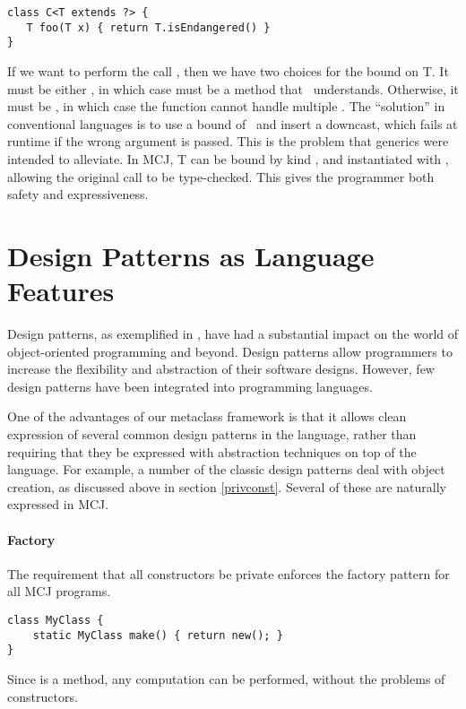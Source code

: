 \documentclass[10pt]{acm-sigplan}
\begin{document}
\begin{verbatim}
class C<T extends ?> {
   T foo(T x) { return T.isEndangered() }
}
\end{verbatim}

If we want to perform the call {}, then we have two
choices for the bound  on {\txt T}.  It must be either \Object,
in which case {} must be a method that \Object\
understands. Otherwise, it must be , in which case the
function cannot handle multiple {\txt{Species}}.  The ``solution'' in
conventional languages is to use a bound of \Object\ and insert a
downcast, which fails at runtime if the wrong argument is passed.
This is the problem that generics were intended to alleviate.  In
MCJ, {\txt T} can be bound by kind {\txt{Species}}, and instantiated
with {\txt{Eagle}}, allowing the original call to be type-checked.
This gives the programmer both safety and expressiveness.

\section{Design Patterns as Language Features}
\label{designpatterns}

Design patterns, as exemplified in \cite{GOF}, have had a substantial
impact on the world of object-oriented programming and beyond.  Design
patterns allow programmers to increase the flexibility and abstraction
of their software designs.  However, few design patterns have been
integrated into programming languages.

One of the advantages of our metaclass framework is that it allows
clean expression of several common design patterns in the language,
rather than requiring that they be expressed with abstraction
techniques on top of the language.  For example, a number of the
classic design patterns deal with object creation, as discussed above
in section \ref{privconst}.  Several of these are naturally expressed
in MCJ.

\paragraph{Factory}
The requirement that all constructors be private enforces the factory
pattern for all MCJ programs.
\begin{verbatim}
class MyClass {
    static MyClass make() { return new(); }
}
\end{verbatim}
Since  is a method, any computation can be performed,
without the problems of constructors.
\end{document}
